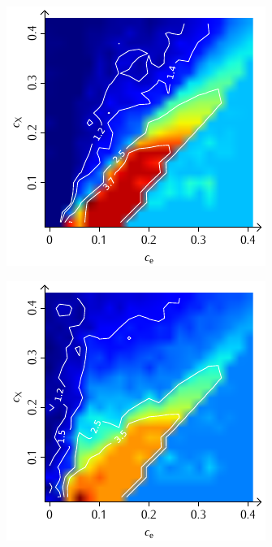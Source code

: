 \documentclass[a4paper, 10pt, twoside, openany]{book} %
\begin{document}
\begin{figure}
\begin{minipage}[t]{0.48\textwidth}
        \label{F_penalty_random_D}
    \end{minipage}
    \begin{minipage}[t]{0.48\textwidth}
        \includegraphics[width=\textwidth]{Abbildungen/Phasendiagramme/Konturen/F_individual_D.pdf}
        \label{F_individual_D}
    \end{minipage}
    \hfill
    \begin{minipage}[t]{0.48\textwidth}
        \includegraphics[width=\textwidth]{Abbildungen/Phasendiagramme/Konturen/F_penalty_individual_D.pdf}

\end{minipage}
\end{figure}
\end{document}
